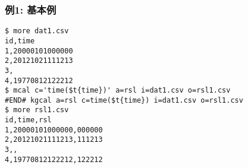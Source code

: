 \subsubsection*{例1: 基本例}



\begin{Verbatim}[baselinestretch=0.7,frame=single]
$ more dat1.csv
id,time
1,20000101000000
2,20121021111213
3,
4,19770812122212
$ mcal c='time($t{time})' a=rsl i=dat1.csv o=rsl1.csv
#END# kgcal a=rsl c=time($t{time}) i=dat1.csv o=rsl1.csv
$ more rsl1.csv
id,time,rsl
1,20000101000000,000000
2,20121021111213,111213
3,,
4,19770812122212,122212
\end{Verbatim}
